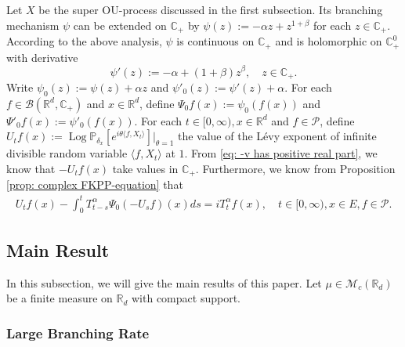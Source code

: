 \documentclass[12pt]{amsart}
\theoremstyle{plain}
\theoremstyle{definition}
\numberwithin{equation}{section}
\begin{document}
\subsection{}
    Let $X$ be the super OU-process discussed in the first subsection.
    Its branching mechanism $\psi$ can be extended on $\mathbb C_+$ by $\psi(z) := -\alpha z + z^{1+\beta}$ for each $z\in \mathbb C_+$.
    According to the above analysis, $\psi$ is continuous on $\mathbb C_+$ and is holomorphic on $\mathbb C_+^0$ with derivative
\begin{equation}
\label{eq: deriavetive of the Poission part}
    \psi'(z) := -\alpha + (1+\beta)z^{\beta},
    \quad z\in \mathbb C_+.
\end{equation}
    Write $\psi_0(z) := \psi(z) + \alpha z$ and $\psi'_0(z) := \psi'(z) + \alpha$.
    For each $f\in \mathcal B(\mathbb R^d, \mathbb C_+)$ and $x\in \mathbb R^d$, define $\Psi_0f(x) := \psi_0(f(x))$ and $\Psi'_0 f(x) := \psi'_0(f(x))$.
    For each $t\in [0,\infty), x\in \mathbb R^d $ and $f \in \mathcal{P}$, define $U_tf(x) := \operatorname{Log} \mathbb P_{\delta_x}[e^{i\theta \langle f, X_t\rangle}]|_{\theta = 1}$ the value of the L\'evy exponent of infinite divisible random variable $\langle f, X_t\rangle$ at $1$.
    From \eqref{eq: -v has positive real part}, we know that $-U_tf(x)$ take values in $\mathbb C_+$. Furthermore, we know from Proposition \ref{prop: complex FKPP-equation} that
\begin{align}
\label{eq:chareq2}
    U_tf(x)-\int_0^t T^{\alpha}_{t-s} \Psi_0(-U_sf)(x)ds
    =i T^{\alpha}_t f(x),
    \quad t\in [0,\infty), x\in E, f\in \mathcal P.
\end{align}

\subsection{Main Result}

In this subsection, we will give the main results of this paper. Let $\mu\in \mathcal M_c(\mathbb R_d)$ be a finite measure on $\mathbb R_d$ with compact support.
\subsubsection{Large Branching Rate}
\end{document}
